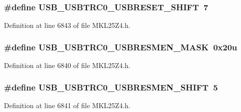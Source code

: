 \subsubsection[{\texorpdfstring{U\+S\+B\+\_\+\+U\+S\+B\+T\+R\+C0\+\_\+\+U\+S\+B\+R\+E\+S\+E\+T\+\_\+\+S\+H\+I\+FT}{USB_USBTRC0_USBRESET_SHIFT}}]{\setlength{\rightskip}{0pt plus 5cm}\#define U\+S\+B\+\_\+\+U\+S\+B\+T\+R\+C0\+\_\+\+U\+S\+B\+R\+E\+S\+E\+T\+\_\+\+S\+H\+I\+FT~7}\hypertarget{group___u_s_b___register___masks_gab20fcb9276a34cbbd33ac0364c419f13}{}\label{group___u_s_b___register___masks_gab20fcb9276a34cbbd33ac0364c419f13}


Definition at line 6843 of file M\+K\+L25\+Z4.\+h.

\subsubsection[{\texorpdfstring{U\+S\+B\+\_\+\+U\+S\+B\+T\+R\+C0\+\_\+\+U\+S\+B\+R\+E\+S\+M\+E\+N\+\_\+\+M\+A\+SK}{USB_USBTRC0_USBRESMEN_MASK}}]{\setlength{\rightskip}{0pt plus 5cm}\#define U\+S\+B\+\_\+\+U\+S\+B\+T\+R\+C0\+\_\+\+U\+S\+B\+R\+E\+S\+M\+E\+N\+\_\+\+M\+A\+SK~0x20u}\hypertarget{group___u_s_b___register___masks_gaf236b1fdfa7f7dab54961c74538dfb75}{}\label{group___u_s_b___register___masks_gaf236b1fdfa7f7dab54961c74538dfb75}


Definition at line 6840 of file M\+K\+L25\+Z4.\+h.

\subsubsection[{\texorpdfstring{U\+S\+B\+\_\+\+U\+S\+B\+T\+R\+C0\+\_\+\+U\+S\+B\+R\+E\+S\+M\+E\+N\+\_\+\+S\+H\+I\+FT}{USB_USBTRC0_USBRESMEN_SHIFT}}]{\setlength{\rightskip}{0pt plus 5cm}\#define U\+S\+B\+\_\+\+U\+S\+B\+T\+R\+C0\+\_\+\+U\+S\+B\+R\+E\+S\+M\+E\+N\+\_\+\+S\+H\+I\+FT~5}\hypertarget{group___u_s_b___register___masks_ga4b62f293769f60cae99319d6bb1299e8}{}\label{group___u_s_b___register___masks_ga4b62f293769f60cae99319d6bb1299e8}


Definition at line 6841 of file M\+K\+L25\+Z4.\+h.

